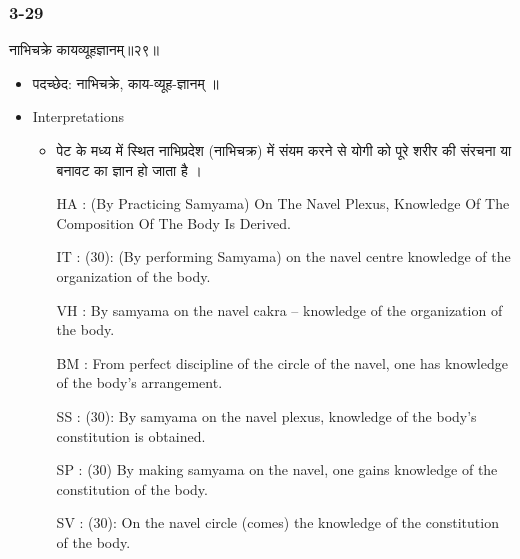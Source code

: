 \begin{frame}[fragile]\frametitle{3-29}
\begin{sanskrit}
नाभिचक्रे कायव्यूहज्ञानम्॥२९॥
\end{sanskrit}

	\begin{itemize}
	\item पदच्छेद:  नाभिचक्रे, काय-व्यूह-ज्ञानम् ॥
	\item Interpretations
		\begin{itemize}	
		\item पेट के मध्य में स्थित नाभिप्रदेश (नाभिचक्र) में संयम करने से योगी को पूरे शरीर की संरचना या बनावट का ज्ञान हो जाता है ।
		\item [HA]: (By Practicing Samyama) On The Navel Plexus, Knowledge Of The Composition Of The Body Is Derived.
		\item [IT]: (30): (By performing Samyama) on the navel centre knowledge of the organization of the body.
		\item [VH]: By samyama on the navel cakra – knowledge of the organization of the body.
		\item [BM]: From perfect discipline of the circle of the navel, one has knowledge of the body’s arrangement.
		\item [SS]: (30): By samyama on the navel plexus, knowledge of the body’s constitution is obtained.
		\item [SP]: (30) By making samyama on the navel, one gains knowledge of the constitution of the body.
		\item [SV]: (30): On the navel circle (comes) the knowledge of the constitution of the body. 
		\end{itemize}
	\end{itemize}
\end{frame}

